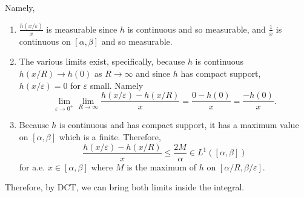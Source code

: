 \documentclass[12pt]{Homework}
\begin{document}
\begin{solution}
Namely, \begin{enumerate}
    \item $\frac{h(x/\varepsilon)}{x}$ is measurable since $h$ is continuous and so measurable, and $\frac{1}{x}$ is continuous on $[\alpha,\beta]$ and so measurable.
    \item The various limits exist, specifically, because $h$ is continuous $h(x/R)\to h(0)$ as $R\to\infty$ and since $h$ has compact support, $h(x/\varepsilon)=0$ for $\varepsilon$ small. Namely $$\lim_{\varepsilon\to0^+}\lim_{R\to\infty}\frac{h(x/\varepsilon)-h(x/R)}{x}=\frac{0-h(0)}{x}=\frac{-h(0)}{x}.$$
    \item Because $h$ is continuous and has compact support, it has a maximum value on $[\alpha,\beta]$ which is a finite. Therefore, $$\frac{h(x/\varepsilon)-h(x/R)}{x}\le\frac{2M}{\alpha}\in L^1([\alpha,\beta])$$ for a.e. $x\in[\alpha,\beta]$ where $M$ is the maximum of $h$ on $[\alpha/R,\beta/\varepsilon].$ 
\end{enumerate} 

Therefore, by DCT, we can bring both limits inside the integral. 
\end{solution}
\vspace{0.5cm}
\end{document}
